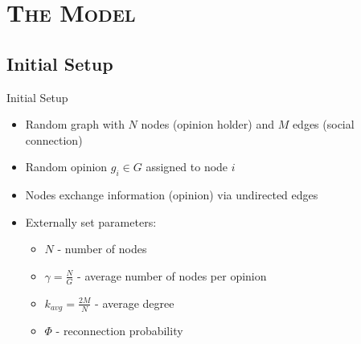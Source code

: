 \documentclass[xcolor=x11names,compress]{beamer}
\renewcommand{\(}{\begin{columns}}
\renewcommand{\)}{\end{columns}}
\newcommand{\<}[1]{\begin{column}{#1}}
\renewcommand{\>}{\end{column}}
\begin{document}
\section{\scshape The Model}

\subsection{Initial Setup}
\begin{frame}{Initial Setup}
\begin{itemize}
\item Random graph with $N$ nodes (opinion holder) and $M$ edges (social connection)
\item Random opinion $g_i \in G$ assigned to node $i$ 
\item Nodes exchange information (opinion) via undirected edges
\item Externally set parameters:
\begin{itemize}
\item $N$ - number of nodes
\item $\gamma = \frac{N}{G}$ - average number of nodes per opinion
\item $k_{avg}=\frac{2M}{N}$ - average degree
\item $\Phi$ - reconnection probability
\end{itemize}
\end{itemize}
\end{frame}

\end{document}
